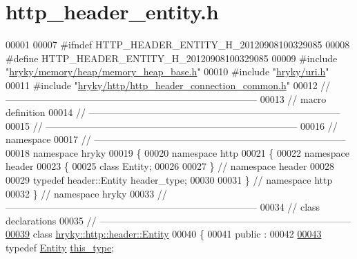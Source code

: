\hypertarget{http__header__entity_8h_source}{\section{http\-\_\-header\-\_\-entity.\-h}
}

\begin{DoxyCode}
00001 
00007 \textcolor{preprocessor}{#ifndef HTTP\_HEADER\_ENTITY\_H\_20120908100329085}
00008 \textcolor{preprocessor}{}\textcolor{preprocessor}{#define HTTP\_HEADER\_ENTITY\_H\_20120908100329085}
00009 \textcolor{preprocessor}{}\textcolor{preprocessor}{#include "\hyperlink{memory__heap__base_8h}{hryky/memory/heap/memory_heap_base.h}"}
00010 \textcolor{preprocessor}{#include "\hyperlink{uri_8h}{hryky/uri.h}"}
00011 \textcolor{preprocessor}{#include "\hyperlink{http__header__connection__common_8h}{hryky/http/http_header_connection_common.h}"}
00012 \textcolor{comment}{//
      ------------------------------------------------------------------------------}
00013 \textcolor{comment}{// macro definition}
00014 \textcolor{comment}{//
      ------------------------------------------------------------------------------}
00015 \textcolor{comment}{//
      ------------------------------------------------------------------------------}
00016 \textcolor{comment}{// namespace}
00017 \textcolor{comment}{//
      ------------------------------------------------------------------------------}
00018 \textcolor{keyword}{namespace }hryky
00019 \{
00020 \textcolor{keyword}{namespace }http
00021 \{
00022 \textcolor{keyword}{namespace }header
00023 \{
00025     \textcolor{keyword}{class }Entity;
00026 
00027 \} \textcolor{comment}{// namespace header}
00028 
00029 \textcolor{keyword}{typedef} header::Entity header\_type;
00030 
00031 \} \textcolor{comment}{// namespace http}
00032 \} \textcolor{comment}{// namespace hryky}
00033 \textcolor{comment}{//
      ------------------------------------------------------------------------------}
00034 \textcolor{comment}{// class declarations}
00035 \textcolor{comment}{//
      ------------------------------------------------------------------------------}
\hypertarget{http__header__entity_8h_source_l00039}{}\hyperlink{classhryky_1_1http_1_1header_1_1_entity}{00039} \textcolor{comment}{}\textcolor{keyword}{class }\hyperlink{classhryky_1_1http_1_1header_1_1_entity}{hryky::http::header::Entity}
00040 \{
00041 \textcolor{keyword}{public} :
00042 
\hypertarget{http__header__entity_8h_source_l00043}{}\hyperlink{classhryky_1_1http_1_1header_1_1_entity_a2d6b33008fa9a1607970c743ee7ee545}{00043}     \textcolor{keyword}{typedef} \hyperlink{classhryky_1_1http_1_1header_1_1_entity}{Entity} \hyperlink{classhryky_1_1http_1_1header_1_1_entity_a2d6b33008fa9a1607970c743ee7ee545}{this_type};

\end{DoxyCode}
